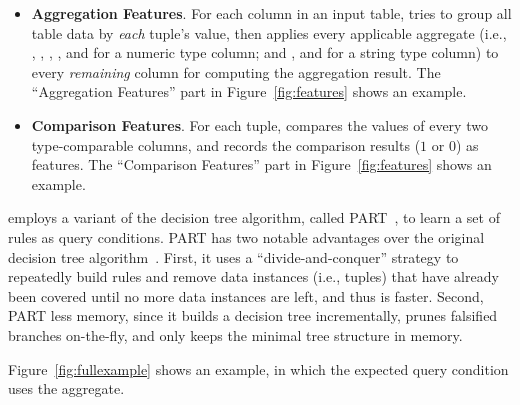 \begin{itemize}

\item {\textbf{Aggregation Features}}. For each
column in an input table, \ourtool tries
to group all table data by \textit{each} tuple's
value, then applies every applicable aggregate (i.e.,
, , ,
, and  for a numeric type column;
and , and  for
a string type column) to every
 \textit{remaining} column for computing the aggregation result. 
The ``Aggregation Features'' part in Figure~\ref{fig:features}
shows an example.

\item {\textbf{Comparison Features}}. For each tuple,
\ourtool compares
the values of every two type-comparable columns, and records
the comparison results ($1$ or $0$) as features.
The ``Comparison Features'' part in Figure~\ref{fig:features}
shows an example.

\end{itemize}



\ourtool employs a variant of the decision tree algorithm,
called PART~\cite{Frank:1998}, to learn a set of rules
as query conditions.
PART has two notable advantages over the
original decision tree algorithm~\cite{Quinlan:1986}.
First, it uses a ``divide-and-conquer'' strategy to repeatedly
build rules and remove data instances (i.e., tuples) that have already been covered until
no more data instances are left, and thus is faster.
Second, PART less memory, since it builds a decision
tree incrementally, prunes falsified branches on-the-fly,
and only keeps the minimal tree structure in memory.





Figure~\ref{fig:fullexample} shows an example, in
which the expected query condition uses the  aggregate.


